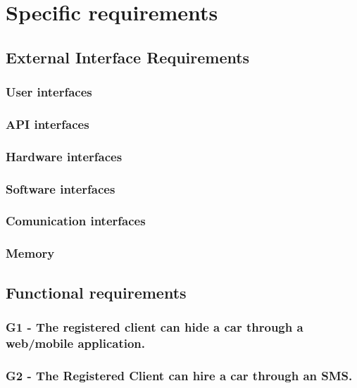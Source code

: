 \chapter{Specific requirements}

\section{External Interface Requirements }

\subsection{User interfaces}

\subsection{API interfaces}

\subsection{Hardware interfaces}

\subsection{Software interfaces}

\subsection{Comunication interfaces}

\subsection{Memory}

\section{Functional requirements}

\subsection{G1 - The registered client can hide a car through a web/mobile application.}

\subsection{G2 - The Registered Client can hire a car through an SMS.}

